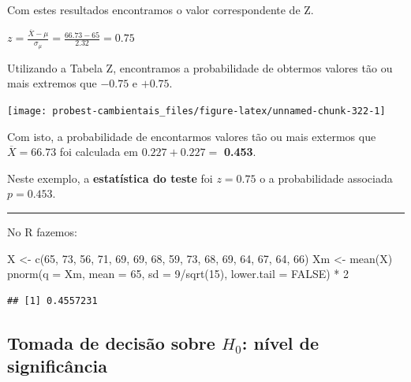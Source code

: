 \documentclass[
]{book}
\newenvironment{Shaded}{\begin{snugshade}}{\end{snugshade}}
\newcommand{\AttributeTok}[1]{\textcolor[rgb]{0.77,0.63,0.00}{#1}}
\newcommand{\ConstantTok}[1]{\textcolor[rgb]{0.00,0.00,0.00}{#1}}
\newcommand{\DecValTok}[1]{\textcolor[rgb]{0.00,0.00,0.81}{#1}}
\newcommand{\FunctionTok}[1]{\textcolor[rgb]{0.00,0.00,0.00}{#1}}
\newcommand{\NormalTok}[1]{#1}
\newcommand{\OtherTok}[1]{\textcolor[rgb]{0.56,0.35,0.01}{#1}}
\newcommand{\SpecialCharTok}[1]{\textcolor[rgb]{0.00,0.00,0.00}{#1}}
\begin{document}
Com estes resultados encontramos o valor correspondente de Z.

\(z = \frac{\overline{X} - \mu}{\sigma_{\mu}} = \frac{66.73 - 65}{2.32} = 0.75\)

Utilizando a Tabela Z, encontramos a probabilidade de obtermos valores tão ou mais extremos que \(-0.75\) e \(+0.75\).

\begin{center}\texttt{[image: probest-cambientais\_files/figure-latex/unnamed-chunk-322-1]} \end{center}

Com isto, a probabilidade de encontarmos valores tão ou mais extermos que \(\overline{X} = 66.73\) foi calculada em \(0.227 + 0.227 =\) \textbf{0.453}.

Neste exemplo, a \textbf{estatística do teste} foi \(z = 0.75\) o a probabilidade associada \(p = 0.453\).

\begin{center}\rule{0.5\linewidth}{0.5pt}\end{center}

No R fazemos:

\begin{Shaded}
\begin{Highlighting}[]
\NormalTok{X }\OtherTok{\textless{}{-}} \FunctionTok{c}\NormalTok{(}\DecValTok{65}\NormalTok{, }\DecValTok{73}\NormalTok{, }\DecValTok{56}\NormalTok{, }\DecValTok{71}\NormalTok{, }\DecValTok{69}\NormalTok{, }\DecValTok{69}\NormalTok{, }\DecValTok{68}\NormalTok{, }\DecValTok{59}\NormalTok{, }\DecValTok{73}\NormalTok{, }\DecValTok{68}\NormalTok{, }\DecValTok{69}\NormalTok{, }\DecValTok{64}\NormalTok{, }\DecValTok{67}\NormalTok{, }\DecValTok{64}\NormalTok{, }\DecValTok{66}\NormalTok{)}
\NormalTok{Xm }\OtherTok{\textless{}{-}} \FunctionTok{mean}\NormalTok{(X)}
\FunctionTok{pnorm}\NormalTok{(}\AttributeTok{q =}\NormalTok{ Xm, }\AttributeTok{mean =} \DecValTok{65}\NormalTok{, }\AttributeTok{sd =} \DecValTok{9}\SpecialCharTok{/}\FunctionTok{sqrt}\NormalTok{(}\DecValTok{15}\NormalTok{), }\AttributeTok{lower.tail =} \ConstantTok{FALSE}\NormalTok{) }\SpecialCharTok{*} \DecValTok{2}
\end{Highlighting}
\end{Shaded}

\begin{verbatim}
## [1] 0.4557231
\end{verbatim}

\hypertarget{tomada-de-decisuxe3o-sobre-h_0-nuxedvel-de-significuxe2ncia}{%
\subsection{\texorpdfstring{Tomada de decisão sobre \(H_0\): nível de significância}{Tomada de decisão sobre H\_0: nível de significância}}\label{tomada-de-decisuxe3o-sobre-h_0-nuxedvel-de-significuxe2ncia}}
\end{document}
